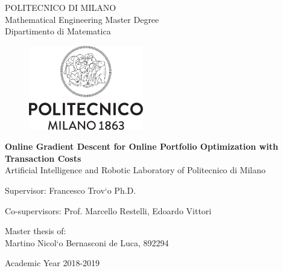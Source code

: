 \thispagestyle{empty}
\vspace*{-1.5cm}
 \bfseries{
\begin{center}
  \large
  POLITECNICO DI MILANO\\
  \normalsize
  Mathematical Engineering Master Degree\\
  Dipartimento di Matematica\\
  \begin{figure}[htbp]
    \begin{center}
      \includegraphics[width=5cm]{./img/logo/Logo_Politecnico_Milano.png}
    \end{center}
  \end{figure}
  \vspace*{0.1cm} \LARGE


    \textbf{Online Gradient Descent for Online Portfolio Optimization with Transaction Costs}\\


  \vspace*{.75truecm} \large
  Artificial Intelligence and Robotic Laboratory \newline of Politecnico di Milano
\end{center}
\vspace*{2.0cm} \large
\begin{flushleft}


  Supervisor: Francesco Trov\a`{o} Ph.D. \\

  \begin{tabbing}  
      Co-supervisors: \= Prof. Marcello Restelli,
      Edoardo Vittori
  \end{tabbing}
\end{flushleft}
\vspace*{1.0cm}
\begin{flushright}


  Master thesis of:\\ Martino Nicol\a`{o} Bernasconi de Luca, 892294\\


\end{flushright}
\vspace*{0.8cm}
\begin{center}

  Academic Year 2018-2019 %
\end{center} \clearpage
}

